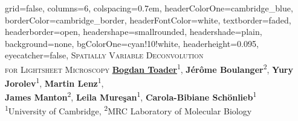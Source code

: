 \documentclass[a0paper,portrait,fontscale=0.35]{baposter}
\theoremstyle{plain}
\theoremstyle{plain}
\theoremstyle{definition}
\theoremstyle{plain}
\theoremstyle{definition}
\begin{document}

\begin{poster}
{
    grid=false,
    columns=6,
    colspacing=0.7em,
    headerColorOne=cambridge_blue,
    borderColor=cambridge_border,
    headerFontColor=white,
    textborder=faded,
    headerborder=open,
    headershape=smallrounded,
    headershade=plain,
    background=none,
    bgColorOne=cyan!10!white,
    headerheight=0.095\textheight,
    eyecatcher=false,
}
{
}
{
  \textsc{Spatially Variable Deconvolution\vspace{0.2cm}\\ 
    for Lightsheet Microscopy\vspace{0.2em}}
}
{
  \vspace{0.1em}
  \hspace{-0.65em}
  {
    \underline{\textbf{Bogdan Toader}}\textsuperscript{1},
    \textbf{J\'{e}r\^{o}me Boulanger}\textsuperscript{2},
    \textbf{Yury Jorolev}\textsuperscript{1},
    \textbf{Martin Lenz}\textsuperscript{1},\\
    \textbf{James Manton}\textsuperscript{2},
    \textbf{Leila Mure\c{s}an}\textsuperscript{1},
    \textbf{Carola-Bibiane Sch\"{o}nlieb}\textsuperscript{1}
  } \\[0.2em]
  {
    \textsuperscript{1}University of Cambridge,
    \textsuperscript{2}MRC Laboratory of Molecular Biology 
  }
  \vspace{-1em}
}

\end{poster}
\end{document}
